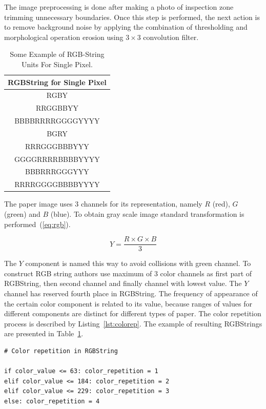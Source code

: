 \documentclass{lutmscthesis}[2010/09/22]
\begin{document}
The image preprocessing is done after making a
photo of inspection zone trimming unnecessary boundaries. Once
this step is performed, the next action is to remove
background noise by applying the combination
of thresholding and morphological operation
erosion using $3\times3$ convolution filter.

\begin{table}[hpt]
\begin{center}
\caption{Some Example of RGB-String Units For Single Pixel.\label{tab:rgbstr}}
{\renewcommand{\arraystretch}{2}
\begin{tabular}{|c|}

\hline
\textbf{RGBString for Single Pixel} \\
\hline
RGBY \\
\hline
RRGGBBYY \\
\hline
BBBBRRRRGGGGYYYY \\
\hline
BGRY \\
\hline
RRRGGGBBBYYY \\
\hline
GGGGRRRRBBBBYYYY \\
\hline
BBBRRRGGGYYY \\
\hline
RRRRGGGGBBBBYYYY \\
\hline

\end{tabular}}
\end{center}
\end{table}

The paper image uses 3 channels for its representation,
namely $R$ (red), $G$ (green) and $B$ (blue). To obtain gray scale
image standard transformation is performed~(\ref{eq:rgb}).

\begin{equation}\label{eq:rgb}
  Y = \frac{R \times G \times B}{3}
\end{equation}

The $Y$ component is named this way to avoid collisions with green channel.
To construct RGB string authors use maximum of 3 color channels
as first part of RGBString, then second channel and finally
channel with lowest value. The $Y$ channel has reserved
fourth place in RGBString. The frequency of appearance
of the certain color component is related to its value,
because ranges of values for different components are
distinct for different types of paper. The color repetition
process is described by Listing~\ref{lst:colorep}. The example
of resulting RGBStrings are presented in Table~\ref{tab:rgbstr}.

\begin{lstlisting}[caption={Color Repetiotion Calculation}, label={lst:colorep}]
# Color repetition in RGBString

if color_value <= 63: color_repetition = 1
elif color_value <= 184: color_repetition = 2
elif color_value <= 229: color_repetition = 3
else: color_repetition = 4
\end{lstlisting}
\end{document}
